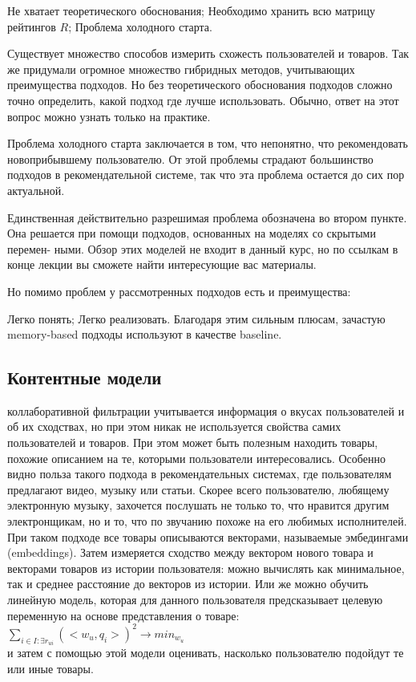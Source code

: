 \documentclass{article}
\newcommand\tab[1][1cm]{\hspace*{#1}}
\begin{document}
Не хватает теоретического обоснования;
Необходимо хранить всю матрицу рейтингов ﻿$R$;
Проблема холодного старта.

Существует множество способов измерить схожесть пользователей и товаров. Так же придумали огромное множество гибридных методов, учитывающих преимущества подходов. Но без теоретического обоснования подходов сложно точно определить, какой подход где лучше использовать. Обычно, ответ на этот вопрос можно узнать только на практике.

Проблема холодного старта заключается в том, что непонятно, что рекомендовать новоприбывшему пользователю. От этой проблемы страдают большинство подходов в рекомендательной системе, так что эта проблема остается до сих пор актуальной.

Единственная действительно разрешимая проблема обозначена во втором пункте. Она решается при помощи подходов, основанных на моделях со скрытыми перемен- ными. Обзор этих моделей не входит в данный курс, но по ссылкам в конце лекции вы сможете найти интересующие вас материалы.

Но помимо проблем у рассмотренных подходов есть и преимущества:

Легко понять;
Легко реализовать.
Благодаря этим сильным плюсам, зачастую memory-based подходы используют в качестве baseline.
\subsection{Контентные модели}
 коллаборативной фильтрации учитывается информация о вкусах пользователей и об их сходствах, но при этом никак не используется свойства самих пользователей и товаров. При этом может быть полезным находить товары, похожие описанием на те, которыми пользователи интересовались. Особенно видно польза такого подхода в рекомендательных системах, где пользователям предлагают видео, музыку или статьи. Скорее всего пользователю, любящему электронную музыку, захочется послушать не только то, что нравится другим электронщикам, но и то, что по звучанию похоже на его любимых исполнителей. \\
При таком подходе все товары описываются векторами, называемые эмбедингами (embeddings). Затем измеряется сходство между вектором нового товара и векторами товаров из истории пользователя: можно вычислять как минимальное, так и среднее расстояние до векторов из истории. Или же можно обучить линейную модель, которая для данного пользователя предсказывает целевую переменную на основе представления о товаре:\\
$\sum_{i\in I:\exists r_{ui}}{(<w_u,q_i>)^2 \to min_{w_{u}}}$\\
и затем с помощью этой модели оценивать, насколько пользователю подойдут те или иные товары.
\end{document}
